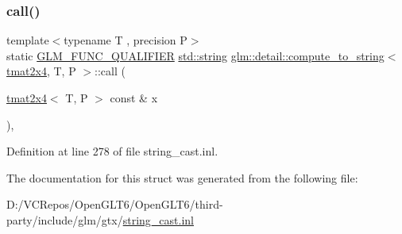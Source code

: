 \subsubsection{\texorpdfstring{call()}{call()}}
{\footnotesize\ttfamily template$<$typename T , precision P$>$ \\
static \mbox{\hyperlink{setup_8hpp_a33fdea6f91c5f834105f7415e2a64407}{G\+L\+M\+\_\+\+F\+U\+N\+C\+\_\+\+Q\+U\+A\+L\+I\+F\+I\+ER}} \mbox{\hyperlink{glad_8h_ac83513893df92266f79a515488701770}{std\+::string}} \mbox{\hyperlink{structglm_1_1detail_1_1compute__to__string}{glm\+::detail\+::compute\+\_\+to\+\_\+string}}$<$ \mbox{\hyperlink{structglm_1_1tmat2x4}{tmat2x4}}, T, P $>$\+::call (\begin{DoxyParamCaption}\item[{\mbox{\hyperlink{structglm_1_1tmat2x4}{tmat2x4}}$<$ T, P $>$ const \&}]{x }\end{DoxyParamCaption})\hspace{0.3cm}{\ttfamily [inline]}, {\ttfamily [static]}}



Definition at line 278 of file string\+\_\+cast.\+inl.



The documentation for this struct was generated from the following file\+:\begin{DoxyCompactItemize}
\item 
D\+:/\+V\+C\+Repos/\+Open\+G\+L\+T6/\+Open\+G\+L\+T6/third-\/party/include/glm/gtx/\mbox{\hyperlink{string__cast_8inl}{string\+\_\+cast.\+inl}}\end{DoxyCompactItemize}
